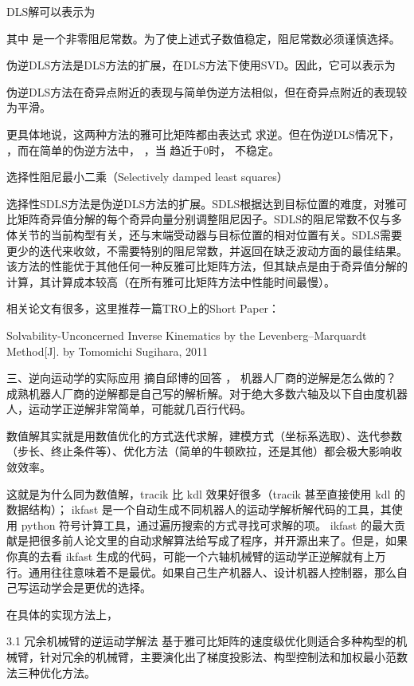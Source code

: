 DLS解可以表示为


其中
是一个非零阻尼常数。为了使上述式子数值稳定，阻尼常数必须谨慎选择。

伪逆DLS方法是DLS方法的扩展，在DLS方法下使用SVD。因此，它可以表示为

伪逆DLS方法在奇异点附近的表现与简单伪逆方法相似，但在奇异点附近的表现较为平滑。

更具体地说，这两种方法的雅可比矩阵都由表达式 
 求逆。但在伪逆DLS情况下， 
 ，而在简单的伪逆方法中， 
 ，当 
 趋近于0时， 
 不稳定。

选择性阻尼最小二乘（Selectively damped least squares）

选择性SDLS方法是伪逆DLS方法的扩展。SDLS根据达到目标位置的难度，对雅可比矩阵奇异值分解的每个奇异向量分别调整阻尼因子。SDLS的阻尼常数不仅与多体关节的当前构型有关，还与末端受动器与目标位置的相对位置有关。SDLS需要更少的迭代来收敛，不需要特别的阻尼常数，并返回在缺乏波动方面的最佳结果。该方法的性能优于其他任何一种反雅可比矩阵方法，但其缺点是由于奇异值分解的计算，其计算成本较高（在所有雅可比矩阵方法中性能时间最慢）。






相关论文有很多，这里推荐一篇TRO上的Short Paper：

Solvability-Unconcerned Inverse Kinematics by the Levenberg–Marquardt Method[J]. by Tomomichi Sugihara, 2011


三、逆向运动学的实际应用
摘自邱博的回答 ， 机器人厂商的逆解是怎么做的？
成熟机器人厂商的逆解都是自己写的解析解。对于绝大多数六轴及以下自由度机器人，运动学正逆解非常简单，可能就几百行代码。

数值解其实就是用数值优化的方式迭代求解，建模方式（坐标系选取）、迭代参数（步长、终止条件等）、优化方法（简单的牛顿欧拉，还是其他）都会极大影响收敛效率。

这就是为什么同为数值解，tracik 比 kdl 效果好很多（tracik 甚至直接使用 kdl 的数据结构）； ikfast 是一个自动生成不同机器人的运动学解析解代码的工具，其使用 python 符号计算工具，通过遍历搜索的方式寻找可求解的项。 ikfast 的最大贡献是把很多前人论文里的自动求解算法给写成了程序，并开源出来了。但是，如果你真的去看 ikfast 生成的代码，可能一个六轴机械臂的运动学正逆解就有上万行。通用往往意味着不是最优。如果自己生产机器人、设计机器人控制器，那么自己写运动学会是更优的选择。


在具体的实现方法上，

3.1 冗余机械臂的逆运动学解法
基于雅可比矩阵的速度级优化则适合多种构型的机械臂，针对冗余的机械臂，主要演化出了梯度投影法、构型控制法和加权最小范数法三种优化方法。

